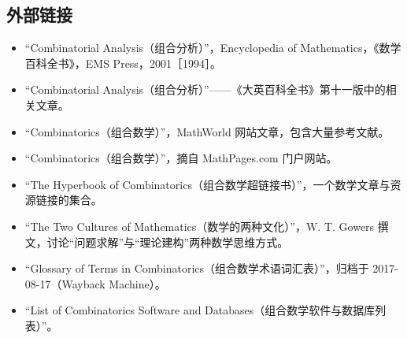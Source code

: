 \subsection{外部链接}
\begin{itemize}
  \item “Combinatorial Analysis（组合分析）”，Encyclopedia of Mathematics，《数学百科全书》，EMS Press，2001［1994］。  
  \item “Combinatorial Analysis（组合分析）”——《大英百科全书》第十一版中的相关文章。  
  \item “Combinatorics（组合数学）”，MathWorld 网站文章，包含大量参考文献。  
  \item “Combinatorics（组合数学）”，摘自 MathPages.com 门户网站。  
  \item “The Hyperbook of Combinatorics（组合数学超链接书）”，一个数学文章与资源链接的集合。  
  \item “The Two Cultures of Mathematics（数学的两种文化）”，W. T. Gowers 撰文，讨论“问题求解”与“理论建构”两种数学思维方式。  
  \item “Glossary of Terms in Combinatorics（组合数学术语词汇表）”，归档于 2017-08-17（Wayback Machine）。  
  \item “List of Combinatorics Software and Databases（组合数学软件与数据库列表）”。  
\end{itemize}





